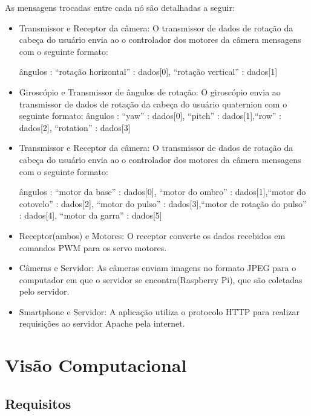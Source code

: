 	As mensagens trocadas entre cada nó são detalhadas a seguir:
	
	\begin{itemize}
		\item Transmissor e Receptor da câmera: O transmissor de dados de rotação da cabeça do usuário envia ao o controlador dos motores da câmera mensagens com o seguinte formato:\par
		ângulos : { “rotação horizontal” : dados[0], “rotação vertical” : dados[1]}
\par
		\item  Giroscópio e Transmissor de ângulos de rotação: O giroscópio envia ao transmissor de dados de rotação da cabeça do usuário quaternion com o seguinte formato:
				ângulos : { “yaw” : dados[0], “pitch” : dados[1],“row” : dados[2], “rotation” : dados[3]}
		
		\item Transmissor e Receptor da câmera: O transmissor de dados de rotação da cabeça do usuário envia ao o controlador dos motores da câmera mensagens com o seguinte formato:\par
		ângulos : { “motor da base” : dados[0], “motor do ombro” : dados[1],“motor do cotovelo” : dados[2], “motor do pulso” : dados[3],“motor de rotação do pulso” : dados[4], “motor da garra” : dados[5]}
		
		\item  Receptor(ambos) e Motores: O receptor converte os dados recebidos em comandos PWM para os servo motores.
		
		\item  Câmeras e Servidor: As câmeras enviam imagens no formato JPEG para o computador em que o servidor se encontra(Raspberry Pi), que são coletadas pelo servidor.
		
		\item  Smartphone e Servidor: A aplicação utiliza o protocolo HTTP para realizar requisições ao servidor Apache pela internet.
		

		
\par

	\end{itemize}


	\section{Visão Computacional}\label{sec-comp}
	\subsection{Requisitos}\label{subsec-req}

